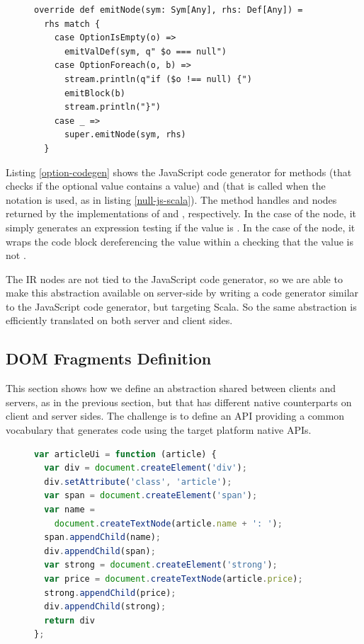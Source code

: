 \documentclass[preprint]{sigplanconf}
\begin{document}
\begin{figure}[htb]
\begin{lstlisting}[caption=JavaScript code generator for null references handling
DSL,label=option-codegen,captionpos=b]
override def emitNode(sym: Sym[Any], rhs: Def[Any]) =
  rhs match {
    case OptionIsEmpty(o) =>
      emitValDef(sym, q" $o === null")
    case OptionForeach(o, b) =>
      stream.println(q"if ($o !== null) {")
      emitBlock(b)
      stream.println("}")
    case _ =>
      super.emitNode(sym, rhs)
  }
\end{lstlisting}
\end{figure}

Listing \ref{option-codegen} shows the JavaScript code generator for methods  (that
checks if the optional value contains a value) and  (that is called when the
 notation is used, as in listing \ref{null-js-scala}). The  method handles
 and  nodes returned by the implementations of
 and , respectively. In the case of the  node, it
simply generates an expression testing if the value is . In the case of the
 node, it wraps the code block dereferencing the value within a 
checking that the value is not .

The IR nodes are not tied to the JavaScript code generator, so we are able to make this abstraction
available on server-side by writing a code generator similar to the JavaScript code generator, but
targeting Scala. So the same abstraction is efficiently translated on both server and client sides.

\subsection{DOM Fragments Definition}
\label{sec:forest}

This section shows how we define an abstraction shared between clients and servers, as in the
previous section, but that has different native counterparts on client and server sides. The
challenge is to define an API providing a common vocabulary that generates code using the target
platform native APIs.

\begin{figure}[htb]
\begin{lstlisting}[language=JavaScript,caption=JavaScript DOM API,label=dom-api]
var articleUi = function (article) {
  var div = document.createElement('div');
  div.setAttribute('class', 'article');
  var span = document.createElement('span');
  var name =
    document.createTextNode(article.name + ': ');
  span.appendChild(name);
  div.appendChild(span);
  var strong = document.createElement('strong');
  var price = document.createTextNode(article.price);
  strong.appendChild(price);
  div.appendChild(strong);
  return div
};
\end{lstlisting}
\end{figure}
\end{document}
